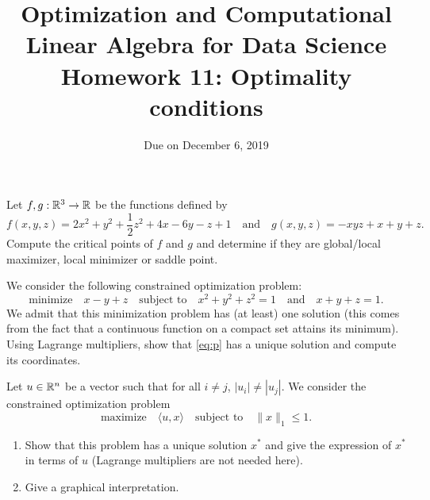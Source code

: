 \documentclass[11pt,nocut]{article}
\title{\vspace{-2.0cm}%
	Optimization and Computational Linear Algebra for Data Science\\
Homework 11: Optimality conditions}
\date{}
\author{Due on December 6, 2019}
\begin{document}
\maketitle


\vspace{1mm}

\begin{problem}[2 points]
	Let $f,g: \mathbb{R}^3 \to \mathbb{R}$ be the functions defined by
	$$
	f(x,y,z) = 2x^2 + y^2 + \frac{1}{2} z^2 + 4x - 6y - z + 1
	\quad \text{and} \quad
	g(x,y,z) =-xyz + x+y+z .
	$$
	Compute the critical points of $f$ and $g$ and determine if they are global/local maximizer, local minimizer or saddle point.
\end{problem}

\vspace{5mm}

\begin{problem}[3 points]
	We consider the following constrained optimization problem:
	\begin{equation}\label{eq:p}
	\text{minimize} \quad x-y+z \quad \text{subject to} \quad x^2 + y^2 + z^2=1 \quad \text{and} \quad x+y+z=1.
	\end{equation}
	We admit that this minimization problem has (at least) one solution (this comes from the fact that a continuous function on a compact set attains its minimum).
	\\

		Using Lagrange multipliers, show that \eqref{eq:p} has a unique solution and compute its coordinates.
\end{problem}

\vspace{5mm}

\begin{problem}[2 points]
	Let $u \in \mathbb{R}^n$ be a vector such that for all $i \neq j$, $|u_i| \neq |u_j|$. We consider the constrained optimization problem
	$$
	\text{maximize} \quad \langle u ,x \rangle \quad \text{subject to} \quad \|x\|_1 \leq 1.
	$$
	\begin{enumerate}[label=\normalfont(\textbf{\alph*})]
		\item Show that this problem has a unique solution $x^*$ and give the expression of $x^*$ in terms of $u$ (Lagrange multipliers are not needed here).
		\item Give a graphical interpretation.
	\end{enumerate}
\end{problem}
\end{document}
